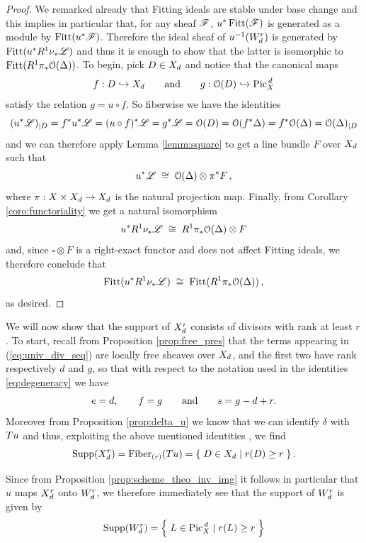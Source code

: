 	\begin{proof}
		We remarked already that Fitting ideals are stable under base change and this implies in particular that, for any sheaf $\mathscr{F}$, $u^*\operatorname{Fitt}(\mathscr{F})$ is generated as a module by $\operatorname{Fitt}(u^*\mathscr{F})$. Therefore the ideal sheaf of $u^{-1}(W_d^r)$ is generated by $\operatorname{Fitt}(u^* R^1\nu_{*}\mathscr{L})$ and thus it is enough to show that the latter is isomorphic to $\operatorname{Fitt}(R^1\pi_* \mathcal{O}(\Delta))$. To begin, pick $D\in X_d$ and notice that the canonical maps
		$$ f: D \hookrightarrow X_d \qquad \text{and} \qquad g: \mathcal{O}(D)\hookrightarrow \operatorname{Pic}^{\,d}_X $$
		satisfy the relation $g = u\circ f$. So fiberwise we have the identities
		$$ (u^* \mathscr{L})_{\mid D} = f^* u^* \mathscr{L} = (u\circ f)^* \mathscr{L} = g^* \mathscr{L} = \mathcal{O}(D) = \mathcal{O}(f^* \Delta) = f^*\mathcal{O}(\Delta) = \mathcal{O}(\Delta)_{\mid D} $$
		and we can therefore apply Lemma \ref{lemm:square} to get a line bundle $F$ over $X_d$ such that
		$$ u^* \mathscr{L} \;\cong\; \mathcal{O}(\Delta) \otimes \pi^* F \,, $$
		where $\pi: X\times X_d \to X_d$ is the natural projection map. Finally, from Corollary \ref{coro:functoriality} we get a natural isomorphism
		$$ u^*  R^1\nu_{*}\mathscr{L} \;\cong\; R^1\pi_*\mathcal{O}(\Delta)\otimes F $$
		and, since $\square\otimes F$ is a right-exact functor and does not affect Fitting ideals, we therefore conclude that
		$$ \operatorname{Fitt}(u^* R^1\nu_{*}\mathscr{L}) 
		\;\cong\; 
		\operatorname{Fitt}(R^1\pi_*\mathcal{O}(\Delta))\,, $$
		as desired.
	\end{proof}


	We will now show that the support of $X_d^r$ consists of divisors with rank at least $r$. To start, recall from Proposition \ref{prop:free_pres} that the terms appearing in (\ref{eq:univ_div_seq}) are locally free sheaves over $X_d$, and the first two have rank respectively $d$ and $g$, so that with respect to the notation used in the identities \eqref{eq:degeneracy} we have 
	\begin{equation}\label{eq:e_f_k}
		e=d, \qquad f=g \qquad \text{and} \qquad s=g-d+r.
	\end{equation}
	Moreover from Proposition \ref{prop:delta_u} we know that we can identify $\delta$ with $Tu$ and thus, exploiting the above mentioned identities , we find
	\begin{equation*}
		\operatorname{Supp}(X_d^r) = \operatorname{Fiber}_{(r)}(Tu) = \left\{\;  D\in X_d \mid r(D) \geq r  \; \right\}.
	\end{equation*}

	Since from Proposition \ref{prop:scheme_theo_inv_img} it follows in particular that $u$ maps $X_d^r$ onto $W_d^r$, we therefore immediately see that the support of $W_d^r$ is given by 
	$$ \operatorname{Supp}(W_d^r) = \left\{\;  L \in \operatorname{Pic}^{\,d}_X \mid r(L) \geq r  \; \right\} $$


